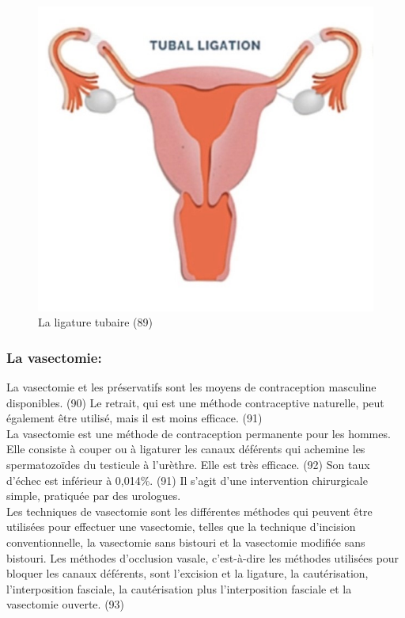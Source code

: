 \begin{figure}[H]
  \centering
  \includegraphics{Images/fig_43.jpg}
  \caption{La ligature tubaire (89)}
\end{figure}

\subsubsection{La vasectomie: }

\noindent La vasectomie et les préservatifs sont les moyens de contraception masculine disponibles. (90) Le retrait, qui est une méthode contraceptive naturelle, peut également être utilisé, mais il est moins efficace. (91)\\

\noindent La vasectomie est une méthode de contraception permanente pour les hommes. Elle consiste à couper ou à ligaturer les canaux déférents qui achemine les spermatozoïdes du testicule à l’urèthre. Elle est très efficace. (92) Son taux d’échec est inférieur à 0,014\%. (91) Il s’agit d’une intervention chirurgicale simple, pratiquée par des urologues. \\

\noindent Les techniques de vasectomie sont les différentes méthodes qui peuvent être utilisées pour effectuer une vasectomie,  telles que la technique d’incision conventionnelle, la vasectomie sans bistouri et la vasectomie modifiée sans bistouri. Les méthodes d’occlusion vasale, c’est-à-dire les méthodes utilisées pour bloquer les canaux déférents, sont l’excision et la ligature, la cautérisation, l’interposition fasciale, la cautérisation plus l’interposition fasciale et la vasectomie ouverte. (93)

